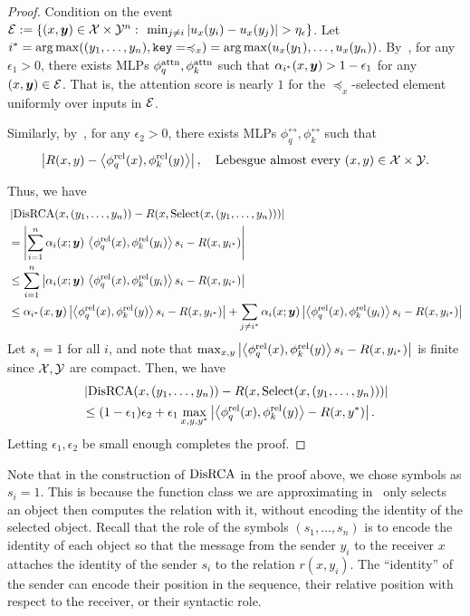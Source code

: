 \begin{proof}
  Condition on the event ${\mathcal{E}} := \{(x, \bm{y}) \in {\mathcal{X}} \times {\mathcal{Y}}^n \,\colon\, \min_{j \neq i} \left\lvert u_x(y_i) - u_x(y_j)\right\rvert > \eta_\epsilon\}$. Let $i^* = \operatorname*{arg\,max}((y_1, \ldots, y_n), \mathtt{key} = \preccurlyeq_x) = \operatorname*{arg\,max}(u_x(y_1), \ldots, u_x(y_n))$. By~\citep[Theorem 5.1]{altabaa2024approximation}, for any $\epsilon_1 > 0$, there exists MLPs $\phi_q^{\mathrm{attn}}, \phi_k^{\mathrm{attn}}$ such that $\alpha_{i^*}(x, \bm{y}) > 1 - \epsilon_1$ for any $(x, \bm{y}) \in {\mathcal{E}}$. That is, the attention score is nearly $1$ for the $\preceq_x$-selected element uniformly over inputs in ${\mathcal{E}}$.

  Similarly, by~\citep[Theorem 3.1]{altabaa2024approximation}, for any $\epsilon_2 > 0$, there exists MLPs $\phi_q^{\rel}, \phi_k^{\rel}$ such that
  \begin{equation*}
    \left\lvert R(x, y) - \left \langle \phi_q^{\mathrm{rel}}(x), \phi_k^{\mathrm{rel}}(y) \right\rangle\right\rvert, \quad \text{Lebesgue almost every } (x, y) \in {\mathcal{X}} \times {\mathcal{Y}}.
  \end{equation*}

  Thus, we have
  \begin{align*}
    &\left\lvert\mathrm{DisRCA}(x, (y_1, \ldots, y_n)) - R(x, \mathrm{Select}(x, (y_1, \ldots, y_n)))\right\rvert \\
    &= \left\lvert\sum_{i=1}^{n} \alpha_i(x; \bm{y}) \,\left \langle \phi_q^{\mathrm{rel}}(x), \phi_k^{\mathrm{rel}}(y_i) \right\rangle s_i - R(x, y_{i^*})\right\rvert \\
    &\leq \sum_{i=1}^{n} \left\lvert\alpha_i(x; \bm{y}) \,\left \langle \phi_q^{\mathrm{rel}}(x), \phi_k^{\mathrm{rel}}(y_i) \right\rangle s_i - R(x, y_{i^*})\right\rvert \\
    &\leq \alpha_{i^*}(x, \bm{y}) \left\lvert\left \langle \phi_q^{\mathrm{rel}}(x), \phi_k^{\mathrm{rel}}(y) \right\rangle s_i - R(x, y_{i^*})\right\rvert + \sum_{j \neq i^*} \alpha_i(x; \bm{y}) \left\lvert\left \langle \phi_q^{\mathrm{rel}}(x), \phi_k^{\mathrm{rel}}(y_i) \right\rangle s_i - R(x, y_{i^*})\right\rvert
  \end{align*}
  Let $s_i = 1$ for all $i$, and note that $\max_{x, y} \left\lvert\left \langle \phi_q^{\mathrm{rel}}(x), \phi_k^{\mathrm{rel}}(y) \right\rangle s_i - R(x, y_{i^*})\right\rvert$ is finite since ${\mathcal{X}}, {\mathcal{Y}}$ are compact. Then, we have
  \begin{align*}
    &\left\lvert\mathrm{DisRCA}(x, (y_1, \ldots, y_n)) - R(x, \mathrm{Select}(x, (y_1, \ldots, y_n)))\right\rvert \\
    &\leq (1 - \epsilon_1) \epsilon_2 + \epsilon_1 \max_{x, y, y^*} \left\lvert\left \langle \phi_q^{\mathrm{rel}}(x), \phi_k^{\mathrm{rel}}(y) \right\rangle - R(x, y^{*})\right\rvert.
  \end{align*}
  Letting $\epsilon_1, \epsilon_2$ be small enough completes the proof.
\end{proof}

\begin{remark}
  Note that in the construction of $\mathrm{DisRCA}$ in the proof above, we chose symbols as $s_i = 1$. This is because the function class we are approximating in~ only selects an object then computes the relation with it, without encoding the identity of the selected object. Recall that the role of the symbols $(s_1, \ldots, s_n)$ is to encode the identity of each object so that the message from the sender $y_i$ to the receiver $x$ attaches the identity of the sender $s_i$ to the relation $r(x, y_i)$. The ``identity'' of the sender can encode their position in the sequence, their relative position with respect to the receiver, or their syntactic role.
\end{remark}
